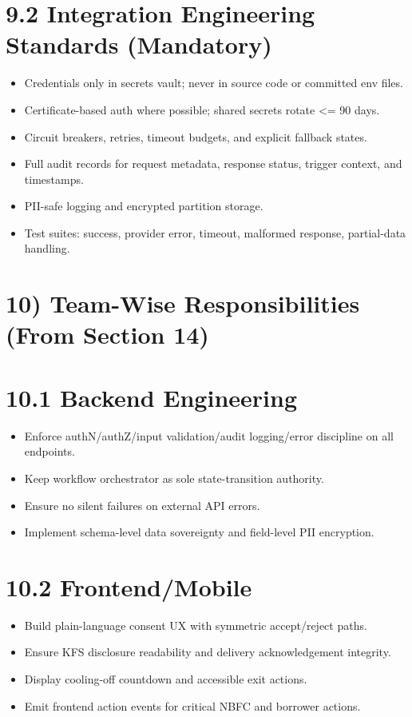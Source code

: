﻿\documentclass[12pt]{article}
\begin{document}
\section{9.2 Integration Engineering Standards (Mandatory)}


\begin{itemize}
\item Credentials only in secrets vault; never in source code or committed env files.
\item Certificate-based auth where possible; shared secrets rotate <= 90 days.
\item Circuit breakers, retries, timeout budgets, and explicit fallback states.
\item Full audit records for request metadata, response status, trigger context, and timestamps.
\item PII-safe logging and encrypted partition storage.
\item Test suites: success, provider error, timeout, malformed response, partial-data handling.
\end{itemize}

\section{10) Team-Wise Responsibilities (From Section 14)}


\section{10.1 Backend Engineering}


\begin{itemize}
\item Enforce authN/authZ/input validation/audit logging/error discipline on all endpoints.
\item Keep workflow orchestrator as sole state-transition authority.
\item Ensure no silent failures on external API errors.
\item Implement schema-level data sovereignty and field-level PII encryption.
\end{itemize}

\section{10.2 Frontend/Mobile}


\begin{itemize}
\item Build plain-language consent UX with symmetric accept/reject paths.
\item Ensure KFS disclosure readability and delivery acknowledgement integrity.
\item Display cooling-off countdown and accessible exit actions.
\item Emit frontend action events for critical NBFC and borrower actions.
\end{itemize}
\end{document}
